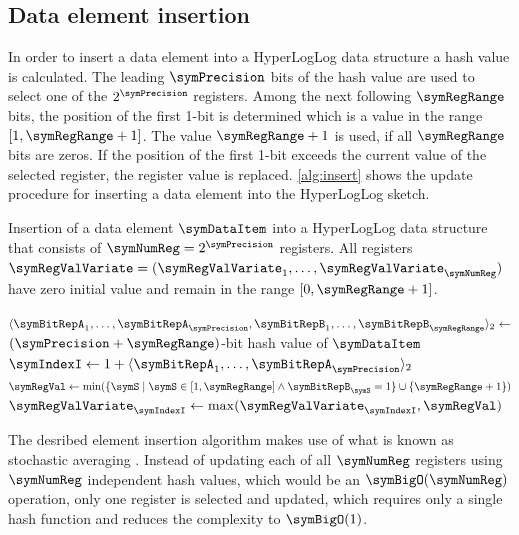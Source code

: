 \documentclass[a4paper]{scrartcl}
\newcommand{\comm}[2]{{\Comment{\parbox[t]{#1\linewidth}{{#2}}}}}
\begin{document}
\subsection{Data element insertion}
\label{sec:data_element_insertion}
In order to insert a data element into a HyperLogLog data structure a hash value is calculated. The leading $\symPrecision$ bits of the hash value are used to select one of the $2^\symPrecision$ registers. Among the next following $\symRegRange$ bits, the position of the first 1-bit is determined which is a value in the range $[1,\symRegRange+1]$. The value $\symRegRange+1$ is used, if all $\symRegRange$ bits are zeros. If the position of the first 1-bit exceeds the current value of the selected register, the register value is replaced. \cref{alg:insert} shows the update procedure for inserting a data element into the HyperLogLog sketch.

\begin{algorithm}
\caption{Insertion of a data element $\symDataItem$ into a HyperLogLog data structure that consists of $\symNumReg=2^\symPrecision$ registers. All registers $\boldsymbol{\symRegValVariate} = (\symRegValVariate_1,\ldots,\symRegValVariate_\symNumReg)$ have zero initial value and remain in the range $[0, \symRegRange+1]$.}
\label{alg:insert}
\begin{algorithmic}
\State $\langle \symBitRepA_1, \ldots, \symBitRepA_\symPrecision,\symBitRepB_1,\ldots,\symBitRepB_\symRegRange\rangle_2 \gets$ $(\symPrecision + \symRegRange)$-bit hash value of $\symDataItem$
\comm{0.2}{$\symBitRepA_\symIndexI,\symBitRepB_\symIndexI\in\{0,1\}$}
\State $\symIndexI \gets 1+ \langle \symBitRepA_1, \ldots, \symBitRepA_\symPrecision\rangle_2$
\comm{0.2}{$\symIndexI\in[1,2^\symPrecision]$}
\State $\symRegVal \gets \min(\{\symS\mid \symS \in [1, \symRegRange]  \wedge  \symBitRepB_\symS = 1\}\cup {\{\symRegRange+1\}} )$
\comm{0.2}{$\symRegVal\in[1,\symRegRange+1]$}
\State $\symRegValVariate_\symIndexI \gets\max(\symRegValVariate_\symIndexI, \symRegVal)$
\EndProcedure
\end{algorithmic}
\end{algorithm}

The desribed element insertion algorithm makes use of what is known as stochastic averaging \cite{Flajolet1985}. Instead of updating each of all $\symNumReg$ registers using $\symNumReg$ independent hash values, which would be an $\symBigO(\symNumReg)$ operation, only one register is selected and updated, which requires only a single hash function and reduces the complexity to $\symBigO(1)$.
\end{document}
